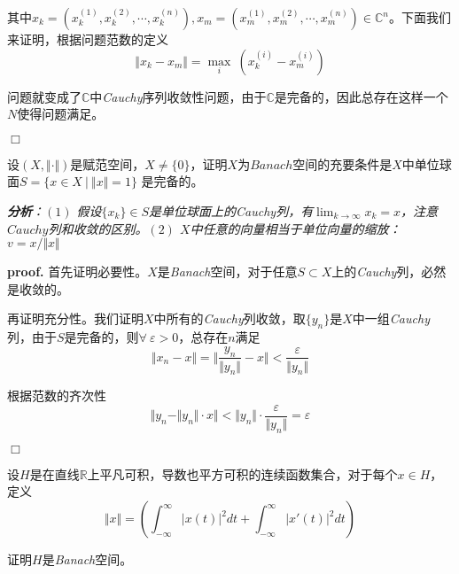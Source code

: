 其中$x_k=(x^{(1)}_k,x^{(2)}_k,\cdots,x^{(n)}_k),x_m=(x^{(1)}_m,x^{(2)}_m,\cdots,x^{(n)}_m)\in \mathbb{C}^n$。下面我们来证明，根据问题范数的定义
\begin{equation}
    \Vert x_k-x_m\Vert=\max\limits_{i}\ (x^{(i)}_k-x^{(i)}_m)
\end{equation}

问题就变成了$\mathbb{C}$中\textsl{Cauchy}序列收敛性问题，由于$\mathbb{C}$是完备的，因此总存在这样一个$N$使得问题满足。

$\Box$

\begin{mdframed}
    \begin{question}
        设$(X,\Vert\cdot\Vert)$是赋范空间，$X\neq\{0\}$，证明$X$为$Banach$空间的充要条件是$X$中单位球面$S=\{x\in X\ |\ \Vert x\Vert=1\}$
        是完备的。
    \end{question}
\end{mdframed}

\textsl{\textbf{分析}：$(1)$ 假设$\{x_k\}\in S$是单位球面上的\textsl{Cauchy}列，有$\lim_{k\rightarrow \infty}x_k=x$，注意$Cauchy$列和收敛的区别。$(2)$ $X$中任意的向量相当于单位向量的缩放：$v=x/\Vert x\Vert$ }

\textbf{proof.} 首先证明必要性。$X$是\textsl{Banach}空间，对于任意$S\subset X$上的\textsl{Cauchy}列，必然是收敛的。

再证明充分性。我们证明$X$中所有的\textsl{Cauchy}列收敛，取$\{y_n\}$是$X$中一组\textsl{Cauchy}列，由于$S$是完备的，则$\forall\ \varepsilon>0$，总存在$n$满足
\begin{equation}
    \Vert x_n-x\Vert=\Vert \frac{y_n}{\Vert y_n\Vert}-x\Vert<\frac{\varepsilon}{\Vert y_n\Vert}
\end{equation}

根据范数的齐次性
\begin{equation}
    \Vert y_n-\Vert y_n\Vert\cdot x\Vert<\Vert y_n\Vert\cdot \frac{\varepsilon}{\Vert y_n\Vert}=\varepsilon
\end{equation}

$\Box$

\begin{mdframed}
    \begin{question}
        设$H$是在直线$\mathbb{R}$上平凡可积，导数也平方可积的连续函数集合，对于每个$x\in H$，定义
        \begin{equation}
            \Vert x\Vert=\left(\int_{-\infty}^{\infty}|x(t)|^2dt+\int_{-\infty}^{\infty}|x'(t)|^2dt\right)
        \end{equation}

        证明$H$是\textsl{Banach}空间。
    \end{question}
\end{mdframed}


